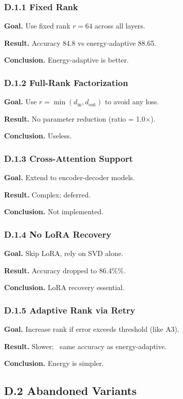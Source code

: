 \subsubsection{D.1.1 Fixed Rank}

\textbf{Goal.} Use fixed rank $r = 64$ across all layers.

\textbf{Result.} Accuracy 84.8 vs energy-adaptive 88.65.

\textbf{Conclusion.} Energy-adaptive is better.

\subsubsection{D.1.2 Full-Rank Factorization}

\textbf{Goal.} Use $r = \min(d_\text{in}, d_\text{out})$ to avoid any loss.

\textbf{Result.} No parameter reduction (ratio = 1.0$\times$).

\textbf{Conclusion.} Useless.

\subsubsection{D.1.3 Cross-Attention Support}

\textbf{Goal.} Extend to encoder-decoder models.

\textbf{Result.} Complex; deferred.

\textbf{Conclusion.} Not implemented.

\subsubsection{D.1.4 No LoRA Recovery}

\textbf{Goal.} Skip LoRA, rely on SVD alone.

\textbf{Result.} Accuracy dropped to 86.4\%\%.

\textbf{Conclusion.} LoRA recovery essential.

\subsubsection{D.1.5 Adaptive Rank via Retry}

\textbf{Goal.} Increase rank if error exceeds threshold (like A3).

\textbf{Result.} Slower; ~same accuracy as energy-adaptive.

\textbf{Conclusion.} Energy is simpler.

\subsection{D.2 Abandoned Variants}

